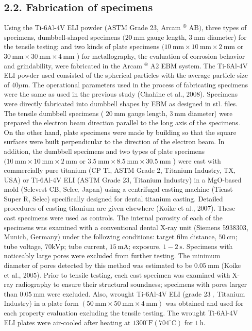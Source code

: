 \documentclass[10pt]{article}
\begin{document}
\subsection*{2.2. Fabrication of specimens}
Using the Ti-6Al-4V ELI powder (ASTM Grade 23, Arcam ${ }^{\circledR}$ $\mathrm{AB})$, three types of specimens, dumbbell-shaped specimens $(20 \mathrm{~mm}$ gauge length, $3 \mathrm{~mm}$ diameter) for the tensile testing; and two kinds of plate specimens $(10 \mathrm{~mm} \times 10 \mathrm{~mm} \times 2 \mathrm{~mm}$ or $30 \mathrm{~mm} \times 30 \mathrm{~mm} \times 4 \mathrm{~mm}$ ) for metallography, the evaluation of corrosion behavior and grindability, were fabricated in the Arcam ${ }^{\circledR}$ A2 EBM system. The Ti-6Al-4V ELI powder used consisted of the spherical particles with the average particle size of $40 \mu \mathrm{m}$. The operational parameters used in the process of fabricating specimens were the same as used in the previous study (Chahine et al., 2008). Specimens were directly fabricated into dumbbell shapes by EBM as designed in stl. files. The tensile dumbbell specimens ( $20 \mathrm{~mm}$ gauge length, $3 \mathrm{~mm}$ diameter) were prepared the electron beam direction parallel to the long axis of the specimens. On the other hand, plate specimens were made by building so that the square surfaces were built perpendicular to the direction of the electron beam. In addition, the dumbbell specimens and two types of plate specimens $(10 \mathrm{~mm} \times 10 \mathrm{~mm} \times 2 \mathrm{~mm}$ or $3.5 \mathrm{~mm} \times 8.5 \mathrm{~mm} \times 30.5 \mathrm{~mm}$ ) were cast with commercially pure titanium (CP Ti, ASTM Grade 2, Titanium Industry, TX, USA) or Ti-6Al-4V ELI (ASTM Grade 23, Titanium Industry) in a MgO-based mold (Selevest CB, Selec, Japan) using a centrifugal casting machine (Ticast Super R, Selec) specifically designed for dental titanium casting. Detailed procedures of casting titanium are given elsewhere (Koike et al., 2007). These cast specimens were used as controls. The internal porosity of each of the specimens was examined with a conventional dental X-ray unit (Siemens 5938303, Munich, Germany) under the following conditions: target film distance, $50 \mathrm{~cm}$; tube voltage, $70 \mathrm{kVp}$; tube current, $15 \mathrm{~mA}$; exposure, $1-2 \mathrm{~s}$. Specimens with noticeably large pores were excluded from further testing. The minimum diameter of pores detected by this method was estimated to be $0.05 \mathrm{~mm}$ (Koike et al., 2005). Prior to tensile testing, each cast specimen was examined with X-ray radiography to ensure their structural soundness; specimens with pores larger than $0.05 \mathrm{~mm}$ were excluded. Also, wrought Ti-6Al-4V ELI (grade 23 , Titanium Industry) in a plate form $(50 \mathrm{~mm} \times 50 \mathrm{~mm} \times 4 \mathrm{~mm})$ was obtained and used for each property evaluation excluding the tensile testing. The wrought Ti-6Al-4V ELI plates were air-cooled after heating at $1300^{\circ} \mathrm{F}\left(704^{\circ} \mathrm{C}\right)$ for $1 \mathrm{~h}$.
\end{document}
